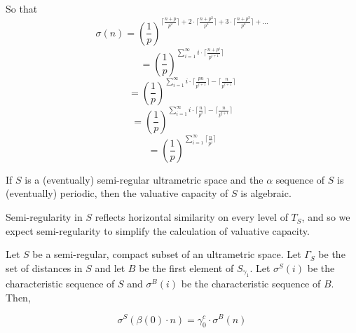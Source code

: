 \begin{proposition*}
\begin{example}
So that \[\sigma(n) = (\frac{1}{p})^ { \lceil\frac{n + p}{p^2}\rceil + 2 \cdot  \lceil\frac{n +p^2}{p^3}\rceil + 3 \cdot  \lceil\frac{n + p^3}{p^4}\rceil + \ldots}\]
\[ = (\frac{1}{p})^ { \sum_{i=1}^\infty i \cdot \lceil\frac{n + p^i}{p^{i+1}}\rceil }\]
\[ = (\frac{1}{p})^ { \sum_{i=1}^\infty i \cdot \lceil\frac{pn}{p^{i+1}}\rceil -  \lceil\frac{n}{p^{i+1}}\rceil }\]
\[ = (\frac{1}{p})^ { \sum_{i=1}^\infty i \cdot \lceil\frac{n}{p^{i}}\rceil -  \lceil\frac{n}{p^{i+1}}\rceil }\]
\[ = (\frac{1}{p})^ { \sum_{i=1}^\infty \lceil \frac{n}{p^{i}}\rceil}\]
\end{example}

\begin{corollary*}
If $S$ is a (eventually) semi-regular ultrametric space and the $\alpha$ sequence of $S$ is (eventually)  periodic, then the valuative capacity of $S$ is algebraic.
\end{corollary*}



Semi-regularity in $S$ reflects horizontal similarity on every level of $T_S$, and so we expect semi-regularity to simplify the calculation of valuative capacity.

\begin{proposition*}
Let $S$ be a semi-regular, compact subset of an ultrametric space. Let $\Gamma_S$ be the set of distances in $S$ and let $B$ be the first element of $S_{\gamma_1}$. Let $\sigma^S(i)$  be the characteristic sequence of $S$ and $\sigma^B(i)$ be the characteristic sequence of $B$. Then,

\[\sigma^S(\beta(0) \cdot n)=\gamma_0^c \cdot \sigma^{B}(n)\]


\end{proposition*}
\end{proposition*}
